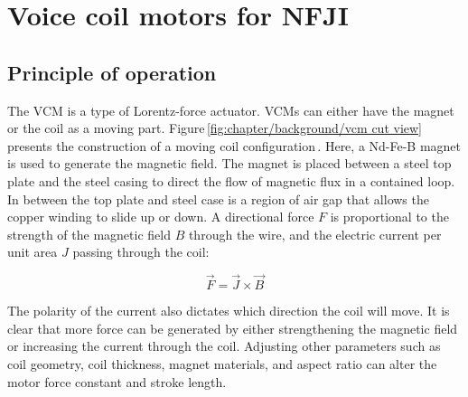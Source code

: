 \section{Voice coil motors for \acs{NFJI}}          \label{Chapter:background/voice coil motors for NFJI}
    
    
    \subsection{Principle of operation}             \label{Chapter:background/voice coil motors for NFJI/principle}


    The \ac{VCM} is a type of Lorentz-force actuator. \acsp{VCM} can either have the magnet or the coil as a moving part. Figure\,\ref{fig:chapter/background/vcm cut view} presents the construction of a moving coil configuration\,\cite{taberner2006}. Here, a Nd-Fe-B magnet is used to generate the magnetic field. The magnet is placed between a steel top plate and the steel casing to direct the flow of magnetic flux in a contained loop. In between the top plate and steel case is a region of air gap that allows the copper winding to slide up or down. A directional force $F$ is proportional to the strength of the magnetic field $B$ through the wire, and the electric current per unit area $J$ passing through the coil:
    
    
    \begin{equation}
        \overrightarrow{F}=\overrightarrow{J}\times \overrightarrow{B}
        \label{eq:force produce via field and current}
    \end{equation}

    The polarity of the current also dictates which direction the coil will move. It is clear that more force can be generated by either strengthening the magnetic field or increasing the current through the coil. Adjusting other parameters such as coil geometry, coil thickness, magnet materials, and aspect ratio can alter the motor force constant and stroke length.
    
